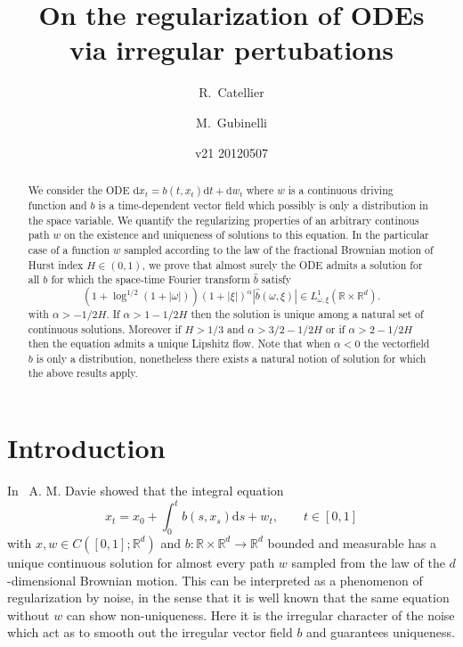 \documentclass[11pt,a4paper,draft,reqno]{amsart}
\theoremstyle{definition}
\newcommand{\RR}{\mathbb{R}}
\newcommand{\dd}{\mathrm{d}}
\begin{document}
\title[Regularization]{On the regularization of ODEs\\ via irregular pertubations}
\author{R.~Catellier}
\address[R.~Catellier]{CEREMADE  UMR 7534 -- Universit\'e Paris--Dauphine}
\author{M.~Gubinelli}
\address[M.~Gubinelli]{CEREMADE  UMR 7534 -- Universit\'e Paris--Dauphine}
\date{v21 20120507}

\begin{abstract}
We consider the ODE $\dd x_t = b(t,x_t)\dd t + \dd w_t$ where $w$ is a continuous driving function and $b$ is a time-dependent vector field which possibly is only a distribution in the space variable. We quantify the regularizing properties of an arbitrary continous path $w$ on the existence and uniqueness of solutions to this equation. In the particular case of a function $w$ sampled according to the law of the fractional Brownian motion of Hurst index $H\in (0,1)$, we prove that almost surely the ODE admits a solution for all $b$ for which the space-time Fourier transform  $\hat b$  satisfy
$$
(1+\log^{1/2}(1+|\omega|)) (1+ |\xi|)^{\alpha} |\hat b(\omega,\xi)|\in L^1_{\omega,\xi}(\RR \times \RR^d) .
$$
with $\alpha > -1/2H$. If $\alpha > 1-1/2H$ then the solution is unique among a natural set of continuous solutions. Moreover if $H>1/3$ and $\alpha > 3/2-1/2H$ or if $\alpha > 2-1/2H$ then the equation admits a unique Lipshitz flow.
Note that when $\alpha < 0$ the vectorfield $b$ is only a distribution, nonetheless there exists a natural notion of solution for which the above results apply.
\end{abstract}

\maketitle

\section{Introduction}

In~\cite{MR2377011} A. M. Davie showed that the integral equation
\begin{equation}
\label{eq:ODE-0}
x_t = x_0 + \int_0^t b(s,x_s) \dd s + w_t, \qquad t\in[0,1]
\end{equation}
with $x,w\in C([0,1];\RR^d)$ and $b:\RR\times\RR^d \to \RR^d$ bounded and measurable has a unique continuous solution for almost
every path $w$ sampled from the law of the $d$-dimensional Brownian motion. This can be interpreted as a phenomenon of
regularization by noise, in the sense that it is well known that the same equation without $w$ can show non-uniqueness. Here
it is the irregular character of the noise which act as to smooth out the irregular vector field $b$ and guarantees uniqueness.
\end{document}
